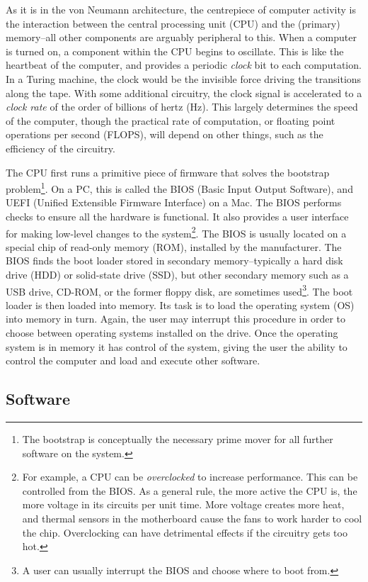 \documentclass[11pt]{amsart}
\begin{document}
As it is in the von Neumann architecture, the centrepiece of computer activity is the interaction between the central processing unit (CPU) and the (primary) memory--all other components are arguably peripheral to this. When a computer is turned on, a component within the CPU begins to oscillate. This is like the heartbeat of the computer, and provides a periodic \emph{clock} bit to each computation. In a Turing machine, the clock would be the invisible force driving the transitions along the tape. With some additional circuitry, the clock signal is accelerated to a \emph{clock rate} of the order of billions of hertz (Hz). This largely determines the speed of the computer, though the practical rate of computation, or floating point operations per second (FLOPS), will depend on other things, such as the efficiency of the circuitry.

The CPU first runs a primitive piece of firmware that solves the bootstrap problem\footnote{The bootstrap is conceptually the necessary prime mover for all further software on the system.}. On a PC, this is called the BIOS (Basic Input Output Software), and UEFI (Unified Extensible Firmware Interface) on a Mac. The BIOS performs checks to ensure all the hardware is functional. It also provides a user interface for making low-level changes to the system\footnote{For example, a CPU can be \emph{overclocked} to increase performance. This can be controlled from the BIOS. As a general rule, the more active the CPU is, the more voltage in its circuits per unit time. More voltage creates more heat, and thermal sensors in the motherboard cause the fans to work harder to cool the chip. Overclocking can have detrimental effects if the circuitry gets too hot.}. The BIOS is usually located on a special chip of read-only memory (ROM), installed by the manufacturer. The BIOS finds the boot loader stored in secondary memory--typically a hard disk drive (HDD) or solid-state drive (SSD), but other secondary memory such as a USB drive, CD-ROM, or the former floppy disk, are sometimes used\footnote{A user can usually interrupt the BIOS and choose where to boot from.}. The boot loader is then loaded into memory. Its task is to load the operating system (OS) into memory in turn. Again, the user may interrupt this procedure in order to choose between operating systems installed on the drive. Once the operating system is in memory it has control of the system, giving the user the ability to control the computer and load and execute other software.

\subsection{Software}
\end{document}
